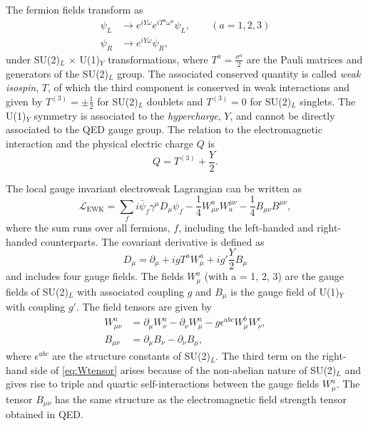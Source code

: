 \noindent The fermion fields transform as
\begin{align}
  \psi_L & \rightarrow e^{iY\omega} e^{iT^a\omega^a} \psi_L, \qquad (a = 1, 2, 3) \\
  \psi_R & \rightarrow e^{iY\omega} \psi_R,
\end{align}
under SU(2)$_L$ $\times$ U(1)$_Y$ transformations, where $T^a=\frac{\sigma^a}{2}$ are the Pauli matrices and generators of the SU(2)$_L$ group.
The associated conserved quantity is called \emph{weak isospin}, $T$, of which the third component is conserved in weak interactions and given by $T^{(3)} = \pm \frac{1}{2}$ for SU(2)$_L$ doublets and $T^{(3)} = 0$ for SU(2)$_L$ singlets.
The U(1)$_Y$ symmetry is associated to the \emph{hypercharge}, $Y$, and cannot be directly associated to the QED gauge group.
The relation to the electromagnetic interaction and the physical electric charge $Q$ is
\begin{equation}
  Q = T^{(3)} + \frac{Y}{2}.
\end{equation}

\noindent The local gauge invariant electroweak Lagrangian can be written as
\begin{equation}
  \mathcal{L}_{\text{EWK}} = \sum_f i\bar{\psi}_{f}\gamma^\mu D_\mu \psi_{f} - \frac{1}{4}W_{\mu\nu}^aW^{\mu\nu}_{a} - \frac{1}{4} B_{\mu\nu}B^{\mu\nu}, 
  \label{eq:lagrangianewk}
\end{equation}
where the sum runs over all fermions, $f$, including the left-handed and right-handed counterparts.
The covariant derivative is defined as
\begin{equation}
  D_\mu = \partial_\mu + igT^aW_\mu^a + ig'\frac{Y}{2}B_\mu 
  \label{eq:covdevewk}
\end{equation}
and includes four gauge fields. The fields $W^a_\mu$ (with a = 1, 2, 3) are the gauge fields of SU(2)$_L$ with associated coupling $g$ and $B_\mu$ is the gauge field of U(1)$_Y$ with coupling $g'$.
The field tensors are given by
\begin{align}
  W_{\mu\nu}^a & = \partial_\mu W_\nu^a - \partial_\nu W_\mu^a - g \epsilon^{abc} W^b_\mu W^c_\nu, \label{eq:Wtensor} \\
  B_{\mu\nu}   & = \partial_\mu B_\nu - \partial_\nu B_\mu,
\end{align}
where $\epsilon^{abc}$ are the structure constants of SU(2)$_L$. The third term on the right-hand side of \cref{eq:Wtensor} arises because of the non-abelian nature of SU(2)$_L$ and gives rise to triple and quartic self-interactions between the gauge fields $W_{\mu}^a$.
The tensor $B_{\mu\nu}$ has the same structure as the electromagnetic field strength tensor obtained in QED.

